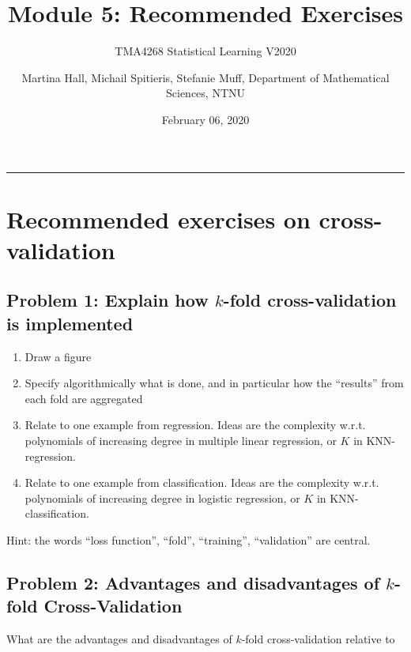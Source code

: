 \documentclass[]{article}
\title{Module 5: Recommended Exercises}
\subtitle{TMA4268 Statistical Learning V2020}
\author{Martina Hall, Michail Spitieris, Stefanie Muff, Department of
Mathematical Sciences, NTNU}
\date{February 06, 2020}
\begin{document}
\maketitle

\begin{center}\rule{0.5\linewidth}{\linethickness}\end{center}

\section{Recommended exercises on
cross-validation}\label{recommended-exercises-on-cross-validation}

\subsection{\texorpdfstring{Problem 1: Explain how \(k\)-fold
cross-validation is
implemented}{Problem 1: Explain how k-fold cross-validation is implemented}}\label{problem-1-explain-how-k-fold-cross-validation-is-implemented}

\begin{enumerate}
\def\labelenumi{\alph{enumi})}
\item
  Draw a figure
\item
  Specify algorithmically what is done, and in particular how the
  ``results'' from each fold are aggregated
\item
  Relate to one example from regression. Ideas are the complexity w.r.t.
  polynomials of increasing degree in multiple linear regression, or
  \(K\) in KNN-regression.
\item
  Relate to one example from classification. Ideas are the complexity
  w.r.t. polynomials of increasing degree in logistic regression, or
  \(K\) in KNN-classification.
\end{enumerate}

Hint: the words ``loss function'', ``fold'', ``training'',
``validation'' are central.

\subsection{\texorpdfstring{Problem 2: Advantages and disadvantages of
\(k\)-fold
Cross-Validation}{Problem 2: Advantages and disadvantages of k-fold Cross-Validation}}\label{problem-2-advantages-and-disadvantages-of-k-fold-cross-validation}

What are the advantages and disadvantages of \(k\)-fold cross-validation
relative to
\end{document}
